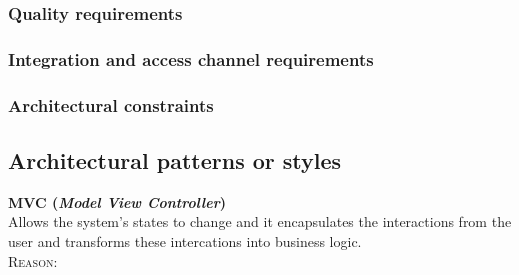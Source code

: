 \documentclass[a4paper,12pt]{article}
\begin{document}
\subsubsection{Quality requirements}
\subsubsection{Integration and access channel requirements}
\subsubsection{Architectural constraints}

\subsection{Architectural patterns or styles}
\textbf{MVC (\textit{Model View Controller})}\\
Allows the system's states to change and it encapsulates the interactions
from the user and transforms these intercations into business logic.\\[0.3cm]
\textsc{Reason:}
\end{document}
